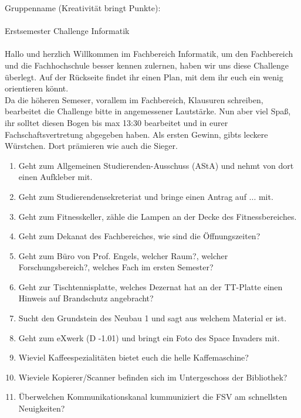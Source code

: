 \documentclass[a4paper,15pt]{scrartcl}
\begin{document}
Gruppenname (Kreativität bringt Punkte):\hrulefill
\\
\\
{\huge Erstsemester Challenge Informatik}
\\
\\

Hallo und herzlich Willkommen im Fachbereich Informatik, um den Fachbereich und die Fachhochschule besser kennen zulernen, haben wir uns diese Challenge überlegt.
Auf der Rückseite findet ihr einen Plan, mit dem ihr euch ein wenig orientieren könnt.\\

Da die höheren Semeser, vorallem im Fachbereich, Klausuren schreiben, bearbeitet die Challenge bitte in angemessener Lautstärke. Nun aber viel Spaß, ihr solltet diesen Bogen bis max 13:30 bearbeitet und in eurer Fachschaftsvertretung abgegeben haben. Als ersten Gewinn, gibts leckere Würstchen. Dort prämieren wie auch die Sieger.

\begin{enumerate}
	\item Geht zum Allgemeinen Studierenden-Ausschuss (AStA) und nehmt von dort einen Aufkleber mit.
	\item Geht zum Studierendensekreteriat und bringe einen Antrag auf ... mit.
	\item Geht zum Fitnesskeller, zähle die Lampen an der Decke des Fitnessbereiches.
	\item Geht zum Dekanat des Fachbereiches, wie sind die Öffnungszeiten?
	\item Geht zum Büro von Prof. Engels, welcher Raum?, welcher Forschungsbereich?, welches Fach im ersten Semester?
	\item Geht zur Tischtennisplatte, welches Dezernat hat an der TT-Platte einen Hinweis auf Brandschutz angebracht?
	\item Sucht den Grundstein des Neubau 1 und sagt aus welchem Material er ist.
	\item Geht zum eXwerk (D -1.01) und bringt ein Foto des Space Invaders mit.
	\item Wieviel Kaffeespezialitäten bietet euch die helle Kaffemaschine?
	\item Wieviele Kopierer/Scanner befinden sich im Untergeschoss der Bibliothek?
	\item Überwelchen Kommunikationskanal kummuniziert die FSV am schnellsten Neuigkeiten?
\end{enumerate}
\end{document}
